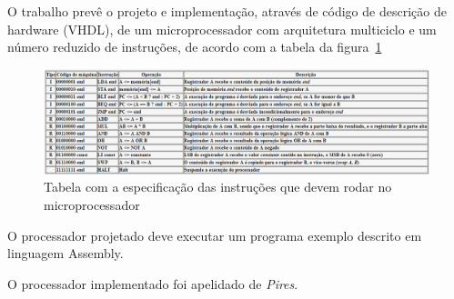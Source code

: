 \documentclass[../main.tex]{subfiles}
\begin{document}
		O trabalho prevê o projeto e implementação, através de código de descrição de hardware (VHDL),
		de um microprocessador com arquitetura multiciclo e um número reduzido de instruções, de acordo com a 
		tabela da figura~\ref{fig:tabela_instrucoes}
		
		\begin{figure}[h]
			\centering
			\includegraphics[width=\textwidth]{img/tabela_instrucoes}
			\caption{Tabela com a especificação das instruções que devem rodar no microprocessador}
			\label{fig:tabela_instrucoes}
		\end{figure}
		
		O processador projetado deve executar um programa exemplo descrito em linguagem Assembly.
		
		O processador implementado foi apelidado de \textit{Pires}.
\end{document}
